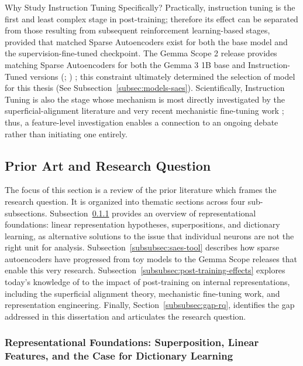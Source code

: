Why Study Instruction Tuning Specifically? Practically, instruction tuning is the first and least complex stage in post-training; therefore its effect can be separated from those resulting from subsequent reinforcement learning-based stages, provided that matched Sparse Autoencoders exist for both the base model and the supervision-fine-tuned checkpoint. The Gemma Scope 2 release provides matching Sparse Autoencoders for both the Gemma 3 1B base and Instruction-Tuned versions (; ) \parencite{google_gemma_3_1b_pt_hf,google_gemma_3_1b_it_hf,mcdougall_gemma_scope_2_2025}; this constraint ultimately determined the selection of model for this thesis (See Subsection~\ref{subsec:models-saes}). Scientifically, Instruction Tuning is also the stage whose mechanism is most directly investigated by the superficial-alignment literature and very recent mechanistic fine-tuning work \parencite{jain_mechanistically_2024, prakash_fine-tuning_2024, du_how_2025}; thus, a feature-level investigation enables a connection to an ongoing debate rather than initiating one entirely.

\subsection{Prior Art and Research Question}
\label{sec:prior-art}

The focus of this section is a review of the prior literature which frames the research question. It is organized into thematic sections across four sub-subsections. Subsection~\ref{subsubsec:repr-foundations} provides an overview of representational foundations: linear representation hypotheses, superpositions, and dictionary learning, as alternative solutions to the issue that individual neurons are not the right unit for analysis. Subsection~\ref{subsubsec:saes-tool} describes how sparse autoencoders have progressed from toy models to the Gemma Scope releases that enable this very research. Subsection~\ref{subsubsec:post-training-effects} explores today's knowledge of to the impact of post-training on internal representations, including the superficial alignment theory, mechanistic fine-tuning work, and representation engineering. Finally, Section~\ref{subsubsec:gap-rq}, identifies the gap addressed in this dissertation and articulates the research question.

\subsubsection{Representational Foundations: Superposition, Linear Features, and the Case for Dictionary Learning}
\label{subsubsec:repr-foundations}

